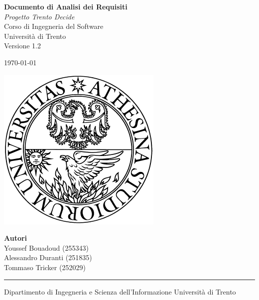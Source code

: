 \documentclass[a4paper]{report}
\begin{document}
\begin{titlepage}
  \centering

  {\Huge \bfseries Documento di Analisi dei Requisiti }\\[1.5em]
  \Large \textit{Progetto Trento Decide}\\[1em]
  \Large {Corso di Ingegneria del Software \\
Università di Trento}\\[1em]

  {\large Versione 1.2 }
  \vspace{0.5cm}

  {\large \today \par}
  \vspace{3.5cm}

  \includegraphics[width=0.33 \textwidth]{img/unitn.png}

\vfill

\begin{flushright}
  \textbf{Autori}\\[0.4em]
  Youssef Bouadoud (255343)\\
  Alessandro Duranti (251835)\\
  Tommaso Tricker (252029)
\end{flushright}

\vspace{1cm}

\hrule
\vspace{0.3em}
{\small
Dipartimento di Ingegneria e Scienza dell'Informazione
Università di Trento
}

\end{titlepage}

\tableofcontents
\newpage





\end{document}
